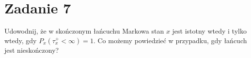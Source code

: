 \section[\nierozwiazane{Zadanie 7}]{Zadanie 7}
\label{set07.task7}
Udowodnij, że w skończonym łańcuchu Markowa stan \(x\) jest istotny wtedy
i tylko wtedy, gdy \(P_x(\tau_x^+ < \infty) = 1\). Co możemy powiedzieć w przypadku, gdy łańcuch
jest nieskończony?

\brakrozwiazania
